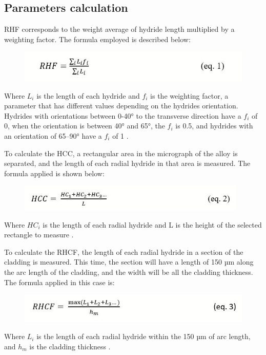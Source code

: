 
\subsection{Parameters calculation}


\noindent
RHF corresponds to the weight average of hydride length multiplied by a weighting factor. The formula employed is described below:


\begin{figure}[h] %
    \raggedleft
    \includegraphics[width=4.5in]{Figures/2-Parameters/RHF.JPG}
    \label{fig:my_label}
\end{figure}


\noindent
Where $L_i$ is the length of each hydride and $f_i$ is the weighting factor, a parameter that has different values depending on the hydrides orientation. Hydrides with orientations between 0-40° to the transverse direction have a $f_i$ of 0, when the orientation is between 40° and 65°, the $f_i$ is 0.5, and hydrides with an orientation of 65–90° have a $f_i$ of 1 \cite{COLAS2013586}. 

\noindent
To calculate the HCC, a rectangular area in the micrograph of the alloy is separated, and the length of each radial hydride in that area is measured. The formula applied is shown below:


\begin{figure}[h] %
    \raggedleft
    \includegraphics[width=4.3in]{Figures/2-Parameters/HCC.JPG}
    \label{fig:my_label}
\end{figure}
\noindent
Where $HC_i$ is the length of each radial hydride and L is the height of the selected rectangle to measure \cite{SIMON2021152817}.

\noindent
To calculate the RHCF, the length of each radial hydride in a section of the cladding is measured. This time, the section will have a length of 150 µm along the arc length of the cladding, and the width will be all the cladding thickness. The formula applied in this case is:

\begin{figure}[h] %
    \raggedleft
    \includegraphics[width=4.5in]{Figures/2-Parameters/RHCF.JPG}
    \label{fig:my_label}
\end{figure}

\vspace{150}
\noindent
Where $L_i$ is the length of each radial hydride within the 150 µm of arc length, and $h_m$ is the cladding thickness \cite{SIMON2021152817}.